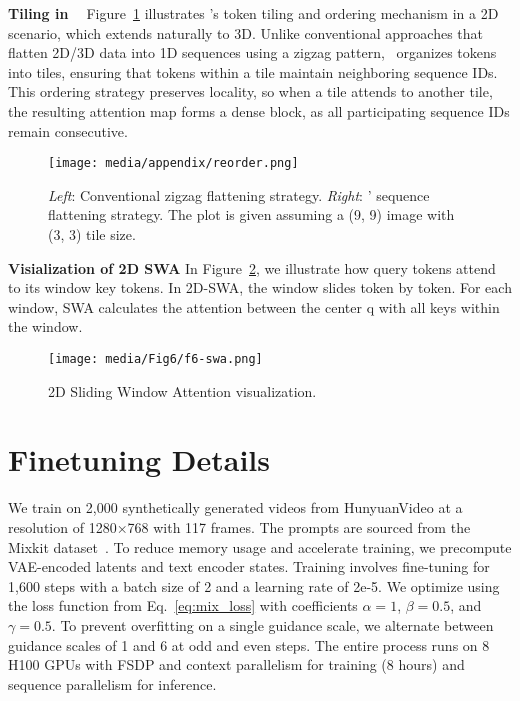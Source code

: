 \textbf{Tiling in ~\methodnameshort} Figure~\ref{fig:reorder} illustrates \methodnameshort's token tiling and ordering mechanism in a 2D scenario, which extends naturally to 3D. Unlike conventional approaches that flatten 2D/3D data into 1D sequences using a zigzag pattern, \methodnameshort~organizes tokens into tiles, ensuring that tokens within a tile maintain neighboring sequence IDs. This ordering strategy preserves locality, so when a tile attends to another tile, the resulting attention map forms a dense block, as all participating sequence IDs remain consecutive.



\begin{figure}[h]
    \centering
    \texttt{[image: media/appendix/reorder.png]} %
    \caption{\textit{Left}: Conventional zigzag flattening strategy. \textit{Right}: \methodnameshort' sequence flattening strategy. The plot is given assuming a (9, 9) image with (3, 3) tile size.}
    \label{fig:reorder}
\end{figure}

\textbf{Visialization of 2D SWA} In Figure~\ref{fig:f6_swa}, we illustrate how query tokens attend to its window key tokens. In 2D-SWA, the window slides token by token. For each window, SWA calculates the attention between the center q with all keys within the window.
\begin{figure}[h]
    \centering
    \texttt{[image: media/Fig6/f6-swa.png]} %
    \caption{2D Sliding Window Attention visualization.}
    \label{fig:f6_swa}
\end{figure}



\section{Finetuning Details}
\label{sec:appendix_finetuning}
We train on 2,000 synthetically generated videos from HunyuanVideo at a resolution of 1280×768 with 117 frames. The prompts are sourced from the Mixkit dataset~\citep{lin2024open}. To reduce memory usage and accelerate training, we precompute VAE-encoded latents and text encoder states. Training involves fine-tuning for 1,600 steps with a batch size of 2 and a learning rate of 2e-5. We optimize using the loss function from Eq.~\eqref{eq:mix_loss} with coefficients $\alpha=1$, $\beta=0.5$, and $\gamma=0.5$. To prevent overfitting on a single guidance scale, we alternate between guidance scales of 1 and 6 at odd and even steps. The entire process runs on 8 H100 GPUs with FSDP and context parallelism for training (8 hours) and sequence parallelism for inference.





